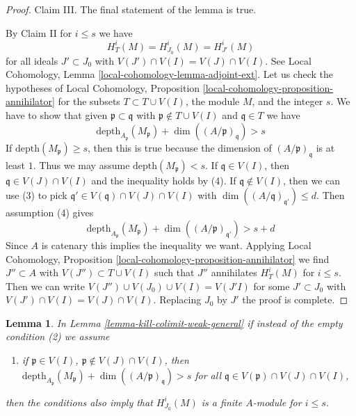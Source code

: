 \documentclass[10pt,a4paper]{amsart}
\theoremstyle{plain}
\newtheorem{lemma}[subsection]{Lemma}
\theoremstyle{definition}
\theoremstyle{remark}
\numberwithin{equation}{subsection}
\begin{document}
\begin{proof}
\medskip\noindent
Claim III. The final statement of the lemma is true.

\medskip\noindent
By Claim II for $i \leq s$ we have
$$
H^i_T(M) = H^i_{J_0}(M) = H^i_{J'}(M)
$$
for all ideals $J' \subset J_0$ with $V(J')  \cap V(I) = V(J) \cap V(I)$.
See Local Cohomology, Lemma \ref{local-cohomology-lemma-adjoint-ext}.
Let us check the hypotheses of Local Cohomology,
Proposition \ref{local-cohomology-proposition-annihilator}
for the subsets $T \subset T \cup V(I)$, the module $M$, and the integer $s$.
We have to show that given $\mathfrak p \subset \mathfrak q$
with $\mathfrak p \not \in T \cup V(I)$ and $\mathfrak q \in T$
we have
$$
\text{depth}_{A_\mathfrak p}(M_\mathfrak p) +
\dim((A/\mathfrak p)_\mathfrak q) > s
$$
If $\text{depth}(M_\mathfrak p) \geq s$, then this is true because
the dimension of $(A/\mathfrak p)_\mathfrak q$ is at least $1$.
Thus we may assume $\text{depth}(M_\mathfrak p) < s$.
If $\mathfrak q \in V(I)$, then $\mathfrak q \in V(J) \cap V(I)$
and the inequality holds by (4). If $\mathfrak q \not \in V(I)$,
then we can use (3) to pick
$\mathfrak q' \in V(\mathfrak q) \cap V(J) \cap V(I)$ with
$\dim((A/\mathfrak q)_{\mathfrak q'}) \leq d$.
Then assumption (4) gives
$$
\text{depth}_{A_\mathfrak p}(M_\mathfrak p) +
\dim((A/\mathfrak p)_{\mathfrak q'}) > s + d
$$
Since $A$ is catenary this implies the inequality we want.
Applying Local Cohomology,
Proposition \ref{local-cohomology-proposition-annihilator} we
find $J'' \subset A$ with $V(J'') \subset T \cup V(I)$
such that $J''$ annihilates $H^i_T(M)$ for $i \leq s$.
Then we can write $V(J'') \cup V(J_0) \cup V(I) = V(J'I)$
for some $J' \subset J_0$ with $V(J') \cap V(I) = V(J) \cap V(I)$.
Replacing $J_0$ by $J'$ the proof is complete.
\end{proof}

\begin{lemma}
\label{lemma-kill-colimit-general}
In Lemma \ref{lemma-kill-colimit-weak-general} if instead of the empty
condition (2) we assume
\begin{enumerate}
\item[(2')] if $\mathfrak p \in V(I)$, $\mathfrak p \not \in V(J) \cap V(I)$,
then
$\text{depth}_{A_\mathfrak p}(M_\mathfrak p) +
\dim((A/\mathfrak p)_\mathfrak q) > s$
for all $\mathfrak q \in V(\mathfrak p) \cap V(J) \cap V(I)$,
\end{enumerate}
then the conditions also imply that $H^i_{J_0}(M)$ is a finite
$A$-module for $i \leq s$.
\end{lemma}
\end{document}
